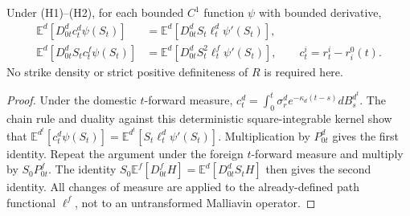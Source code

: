 \begin{lem}\label{lem: duality}
Under (H1)--(H2), for each bounded $C^1$ function $\psi$ with bounded derivative,
\begin{align*}
\mathbb E^d[D^d_{0t}c^d_t\psi(S_t)]
 &=\mathbb E^d[D^d_{0t}S_t\ell^d_t\psi'(S_t)],\\
\mathbb E^d[D^d_{0t}S_tc^f_t\psi(S_t)]
 &=\mathbb E^d[D^d_{0t}S_t^2\ell^f_t\psi'(S_t)],
\qquad c^i_t=r^i_t-r_i^0(t).
\end{align*}
No strike density or strict positive definiteness of $R$ is required here.
\end{lem}
\begin{proof}
Under the domestic $t$-forward measure,
$c_t^d=\int_0^t\sigma_r^d e^{-\kappa_d(t-s)}dB_s^{d^t}$.
The chain rule and duality against this deterministic square-integrable kernel
show that $\mathbb E^{d^t}[c_t^d\psi(S_t)]
=\mathbb E^{d^t}[S_t\ell_t^d\psi'(S_t)]$.
Multiplication by $P^d_{0t}$ gives the first identity. Repeat the argument
under the foreign $t$-forward measure and multiply by $S_0P^f_{0t}$.
The identity $S_0\mathbb E^f[D^f_{0t}H]=\mathbb E^d[D^d_{0t}S_tH]$
then gives the second identity. All changes of measure are applied to the
already-defined path functional $\ell^f$, not to an untransformed Malliavin operator.
\end{proof}

